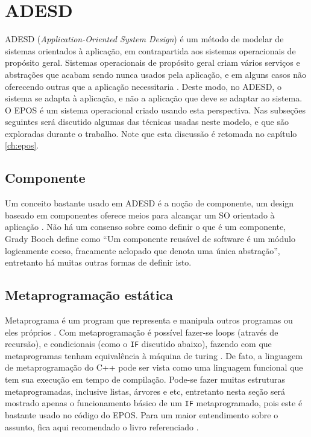 \section{ADESD}

ADESD (\emph{Application-Oriented System Design}) é um método de modelar de sistemas orientados à aplicação, em contrapartida aos sistemas operacionais de propósito geral.
Sistemas operacionais de propósito geral criam vários serviços e abstrações que acabam sendo nunca usados pela aplicação, e em alguns casos não oferecendo outras que a aplicação necessitaria \cite{guto_thesis}. Deste modo, no ADESD, o sistema se adapta à aplicação, e não a aplicação que deve se adaptar ao sistema. O EPOS é um sistema operacional criado usando esta perspectiva. Nas subseções seguintes será discutido algumas das técnicas usadas neste modelo, e que são exploradas durante o trabalho. Note que esta discussão é retomada no capítulo \ref{ch:epos}.

\subsection{Componente}
Um conceito bastante usado em ADESD é a noção de componente, um design baseado em componentes oferece meios para alcançar um SO orientado à aplicação \cite[p.~4]{guto_thesis}. Não há um consenso sobre como definir o que é um componente, Grady Booch define como ``Um componente reusável de software é um módulo logicamente coeso, fracamente aclopado que denota uma única abstração'', entretanto há muitas outras formas de definir isto.


\subsection{Metaprogramação estática}
Metaprograma é um program que representa e manipula outros programas ou eles próprios \cite{generative}.
Com metaprogramação é possível fazer-se loops (através de recursão), e condicionais (como o \verb+IF+ discutido abaixo), fazendo com que metaprogramas tenham equivalência à máquina de turing \cite{generative}. De fato, a linguagem de metaprogramação do C++ pode ser vista como uma linguagem funcional que tem sua execução em tempo de compilação. Pode-se fazer muitas estruturas metaprogramadas, inclusive listas, árvores e etc, entretanto nesta seção será mostrado apenas o funcionamento básico de um \verb+IF+ metaprogramado, pois este é bastante usado no código do EPOS. Para um maior entendimento sobre o assunto, fica aqui recomendado o livro referenciado \cite{generative}.

